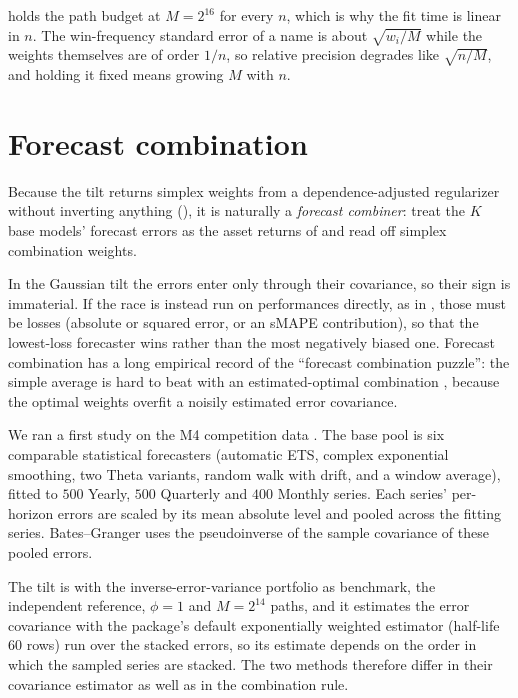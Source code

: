  holds the path budget at $M = 2^{16}$ for every $n$, which is
why the fit time is linear in $n$. The win-frequency standard error of a name is
about $\sqrt{w_i/M}$ while the weights themselves are of order $1/n$, so relative
precision degrades like $\sqrt{n/M}$, and holding it fixed means growing $M$ with
$n$.

\section{Forecast combination}
\label{sec:combination}

Because the tilt returns simplex weights from a dependence-adjusted regularizer
without inverting anything (), it is naturally a
\emph{forecast combiner}: treat the $K$ base models' forecast errors as the
asset returns of  and read off simplex combination weights.

In the
Gaussian tilt the errors enter only through their covariance, so their sign is
immaterial. If the race is instead run on performances directly, as in
, those must be losses (absolute or squared error, or an sMAPE
contribution), so that the lowest-loss forecaster wins rather than the most
negatively biased one.
Forecast
combination has a long empirical record of the ``forecast combination puzzle'':
the simple average is hard to beat with an estimated-optimal combination
\parencite{bates1969,timmermann2006}, because the optimal weights overfit a noisily
estimated error covariance.

We ran a first study on the M4 competition data \parencite{makridakis2020}.
The
base pool is six comparable statistical forecasters (automatic ETS, complex
exponential smoothing, two Theta variants, random walk with drift, and a window
average), fitted to $500$ Yearly, $500$ Quarterly and $400$ Monthly series.
Each
series' per-horizon errors are scaled by its mean absolute level and pooled across
the fitting series.
Bates--Granger uses the pseudoinverse of the sample covariance
of these pooled errors.

The tilt is  with the inverse-error-variance
portfolio as benchmark, the independent reference, $\phi = 1$ and $M = 2^{14}$
paths, and it estimates the error covariance with the package's default
exponentially weighted estimator (half-life $60$ rows) run over the stacked errors,
so its estimate depends on the order in which the sampled series are stacked.
The
two methods therefore differ in their covariance estimator as well as in the
combination rule.


